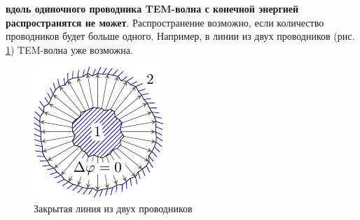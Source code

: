 \documentclass[a4paper,14pt]{extarticle}
\renewcommand{\phi}{\varphi}
\begin{document}
%
%
%
%
%

\textbf{вдоль одиночного проводника TEM-волна с конечной энергией распространятся не может}. Распространение возможно, если количество проводников будет больше одного. Например, в линии из двух проводников (рис. \ref{fig:lect4:4}) TEM-волна уже возможна.

\begin{figure}[h!]
	\centering
	\includegraphics[scale=1.5]{img/lect4_ris4}
	\caption{Закрытая линия из двух проводников}
	\label{fig:lect4:4}
\end{figure}
\end{document}
